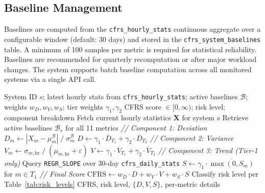 \documentclass{ieeeaccess}
\begin{document}
\subsection{Baseline Management}
Baselines are computed from the \texttt{cfrs\_hourly\_stats} continuous aggregate over a configurable window (default: 30 days) and stored in the \texttt{cfrs\_system\_baselines} table. A minimum of 100 samples per metric is required for statistical reliability. Baselines are recommended for quarterly recomputation or after major workload changes. The system supports batch baseline computation across all monitored systems via a single API call.



\begin{algorithm}[t]
\caption{CFRS Score Computation}
\label{alg:cfrs}
\begin{algorithmic}[1]
\renewcommand{\algorithmicrequire}{\textbf{Input:}}
\renewcommand{\algorithmicensure}{\textbf{Output:}}
\REQUIRE System ID $s$; latest hourly stats from \texttt{cfrs\_hourly\_stats}; active baselines $\mathcal{B}$; weights $w_D, w_V, w_S$; tier weights $\gamma_1, \gamma_2$
\ENSURE CFRS score $\in [0, \infty)$; risk level; component breakdown
\STATE Fetch current hourly statistics $\mathbf{X}$ for system $s$
\STATE Retrieve active baselines $\mathcal{B}_s$ for all 11 metrics
\STATE \textit{// Component 1: Deviation}
    \STATE $D_m \leftarrow |X_m - \mu_{m}^{\mathcal{B}}| \;/\; \sigma_{m}^{\mathcal{B}}$
\ENDFOR
\STATE $D \leftarrow \gamma_1 \cdot \overline{D}_{T_1} + \gamma_2 \cdot \overline{D}_{T_2}$
\STATE \textit{// Component 2: Variance}
    \STATE $V_m \leftarrow \sigma_{m,\text{hr}} \;/\; (\mu_{m,\text{hr}} + \varepsilon)$
\ENDFOR
\STATE $V \leftarrow \gamma_1 \cdot \overline{V}_{T_1} + \gamma_2 \cdot \overline{V}_{T_2}$
\STATE \textit{// Component 3: Trend (Tier-1 only)}
\STATE Query \texttt{REGR\_SLOPE} over 30-day \texttt{cfrs\_daily\_stats}
\STATE $S \leftarrow \gamma_1 \cdot \overline{\max(0, S_m)}$ for $m \in T_1$
\STATE \textit{// Final Score}
\STATE $\text{CFRS} \leftarrow w_D \cdot D + w_V \cdot V + w_S \cdot S$
\STATE Classify risk level per Table~\ref{tab:risk_levels}
\RETURN CFRS, risk level, $\{D, V, S\}$, per-metric details
\end{algorithmic}
\end{algorithm}
\end{document}
